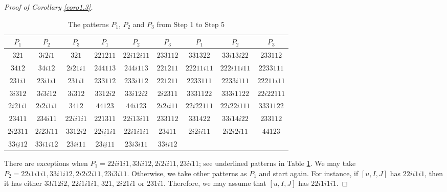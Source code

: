 \documentclass[12pt]{amsart}
\theoremstyle{definition}
\theoremstyle{remark}
\begin{document}
\begin{proof}[Proof of Corollary \ref{coro1.3}]
\begin{table}[h!]
\centering
\begin{tabular}{||c c c || c c c || c c c ||} 
 \hline
 $P_1$ & $P_2$ & $P_3$ & $P_1$ & $P_2$ & $P_3$ & $P_1$ & $P_2$ & $P_3$ \\ [0.5ex] 
 \hline\hline
$321$ & $3i2i1$ & $321$ & {}  $221211$ & $22i12i11$ & $233112$ & {} $331322$ & $33i13i22$ & $233112$ \\
$3412$ & $34i12$ & $2i21i1$ & {} $244113$ & $244i113$ & $221211$ {} & $22211i11$ & $222i11i11$ & $2233111$\\
$231i1$ & $23i1i1$ & $231i1$ & {} $233112$ & $233i112$ & $221211$ & {} $2233111$ & $2233i111$ & $22211i11$ {} \\
$3i312$ & $3i3i12$ & $3i312$ & {} $3312i2$ & $33i12i2$ & $2i2311$ {} &  $3331122$ & $333i1122$ & $22i22111$\\
$2i21i1$ & $2i2i1i1$ & $3412$ & {}  $44123$ & $44i123$ & $2i2ii11$ & {} $22i22111$ & $22i22i111$ & $3331122$  {} \\
$23411$ & $234i11$ & $22ii1i1$ {} & $221311$ & $22i13i11$ & $233112$ & {} $331422$ & $33i14i22$ & $233112$ {} \\
$2i2311$ & $2i23i11$ & $3312i2$ & {} $\underline{22ii1i1}$ & $22i1i1i1$ & $23411$ & {} $\underline{2i2ii11}$ & $2i2i2i11$ & $44123$\\
$\underline{33ii12}$ & $33i1i12$ & $23ii11$ & {} $\underline{23ii11}$ & $23i3i11$ & $33ii12$ & {} & & {}\\ [1ex]
 \hline
\end{tabular}
\caption{The patterns $P_1$, $P_2$ and $P_3$ from Step 1 to Step 5}
\label{tab1}
\end{table}
There are exceptions when $P_1 = 22ii1i1, 33ii12, 2i2ii11 , 23ii11$; see underlined patterns in Table \ref{tab1}. We may take $P_2 = 22i1i1i1 , 33i1i12 , 2i2i2i11 , 23i3i11$. Otherwise, we take other patterns as $P_1$ and start again. For instance, if $[u,I,J]$ has $22ii1i1$, then it has either $33i12i2$, $22i1i1i1$, $321$, $2i21i1$ or $231i1$. Therefore, we may assume that $[u,I,J]$ has $22i1i1i1$.
\end{proof}
\end{document}
